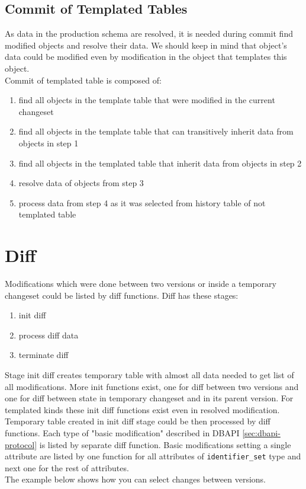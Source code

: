 \documentclass[deska]{subfiles}
\begin{document}
\subsection{Commit of Templated Tables}
As data in the production schema are resolved, it is needed during commit find modified objects and resolve their data. We should keep in mind that object's data could be modified even by modification in the object that templates this object.\\
Commit of templated table is composed of:
\begin{enumerate}
    \item find all objects in the template table that were modified in the current changeset
    \item find all objects in the template table that can transitively inherit data from objects in step 1
    \item find all objects in the templated table that inherit data from objects in step 2
    \item resolve data of objects from step 3
    \item process data from step 4 as it was selected from history table of not templated table
\end{enumerate}

\section{Diff}
Modifications which were done between two versions or inside a temporary changeset could be listed by diff functions. Diff has these stages:
\begin{enumerate}
    \item init diff
    \item process diff data
    \item terminate diff
\end{enumerate}
Stage init diff creates temporary table with almost all data needed to get list of all modifications.
More init functions exist, one for diff between two versions and one for diff between state in temporary changeset and in its parent version. For templated kinds these init diff functions exist even in resolved modification.\\
Temporary table created in init diff stage could be then processed by diff functions. Each type of "basic modification" described in DBAPI \ref{sec:dbapi-protocol} is listed by separate diff function. Basic modifications setting a single attribute are listed by one function for all attributes of {\tt identifier\_set} type and next one for the rest of attributes.\\
The example below shows how you can select changes between versions.
\end{document}
